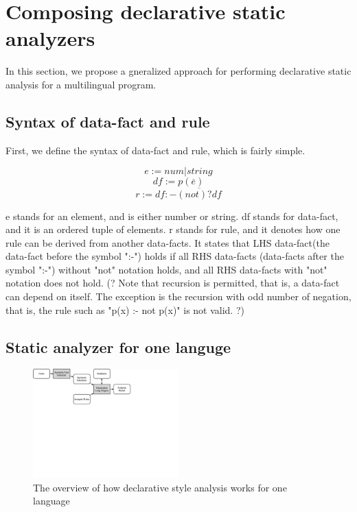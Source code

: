 \section{Composing declarative static analyzers}

In this section, we propose a gneralized approach for performing declarative
static analysis for a multilingual program.

\subsection{Syntax of data-fact and rule}

First, we define the syntax of data-fact and rule, which is fairly simple.

\[e := num | string\]
\[df := p(\overline{e})\]
\[r := df :- \overline{(not)? df}\]

e stands for an element, and is either number or string.  df stands for
data-fact, and it is an ordered tuple of elements.  r stands for rule, and it
denotes how one rule can be derived from another data-facts.  It states that
LHS data-fact(the data-fact before the symbol ":-") holds if all RHS data-facts
(data-facts after the symbol ":-") without "not" notation holds, and all RHS
data-facts with "not" notation does not hold.  (? Note that recursion is
permitted, that is, a data-fact can depend on itself.  The exception is the
recursion with odd number of negation, that is, the rule such as "p(x) :- not
p(x)" is not valid. ?)

\subsection{Static analyzer for one languge}

\begin{figure}[t]
  \centering
  \vspace{2mm}
  \includegraphics[width=0.5\textwidth]{img/overview}
  \vspace*{-1.5em}
  \caption{The overview of how declarative style analysis works for
  one language}
  \label{fig:overview}
\vspace*{-.5em}
\end{figure}


